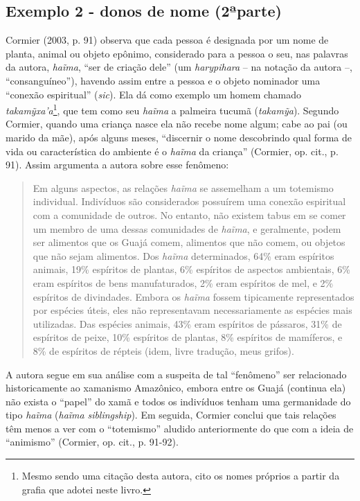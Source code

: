 \subsection{Exemplo 2 - donos de nome (2ªparte)}

Cormier (2003, p. 91) observa que cada pessoa é designada por um nome de
planta, animal ou objeto epônimo, considerado para a pessoa o seu, nas
palavras da autora, \emph{haĩma}, ``ser de criação dele'' (um
\emph{harypihara} -- na notação da autora --, ``consanguíneo''), havendo
assim entre a pessoa e o objeto nominador uma ``conexão espiritual''
(\emph{sic}). Ela dá como exemplo um homem chamado
\emph{takamỹxa'a}\footnote{Mesmo sendo uma citação desta autora, cito os
  nomes próprios a partir da grafia que adotei neste livro.}, que tem
como seu \emph{haĩma} a palmeira tucumã (\emph{takamỹa}). Segundo
Cormier, quando uma criança nasce ela não recebe nome algum; cabe ao pai
(ou marido da mãe), após alguns meses, ``discernir o nome descobrindo
qual forma de vida ou característica do ambiente é o \emph{haĩma} da
criança'' (Cormier, op. cit., p. 91). Assim argumenta a autora sobre esse
fenômeno:

\begin{quote}
Em alguns aspectos, as relações \emph{haĩma} se assemelham a um
totemismo individual. Indivíduos são considerados possuírem uma conexão
espiritual com a comunidade de outros. No entanto, não existem tabus em
se comer um membro de uma dessas comunidades de \emph{haĩma}, e
geralmente, podem ser alimentos que os Guajá comem, alimentos que não
comem, ou objetos que não sejam alimentos. Dos \emph{haĩma}
determinados, 64\% eram espíritos animais, 19\% espíritos de plantas,
6\% espíritos de aspectos ambientais, 6\% eram espíritos de bens
manufaturados, 2\% eram espíritos de mel, e 2\% espíritos de divindades.
Embora os \emph{haĩma} fossem tipicamente representados por espécies
úteis, eles não representavam necessariamente as espécies mais
utilizadas. Das espécies animais, 43\% eram espíritos de pássaros, 31\%
de espíritos de peixe, 10\% espíritos de plantas, 8\% espíritos de
mamíferos, e 8\% de espíritos de répteis (idem, livre tradução, meus
grifos).
\end{quote}

A autora segue em sua análise com a suspeita de tal ``fenômeno'' ser
relacionado historicamente ao xamanismo Amazônico, embora entre os Guajá
(continua ela) não exista o ``papel'' do xamã e todos os indivíduos tenham
uma germanidade do tipo \emph{haĩma} (\emph{haĩma} \emph{siblingship}).
Em seguida, Cormier conclui que tais relações têm menos a ver com o
``totemismo'' aludido anteriormente do que com a ideia de ``animismo''
(Cormier, op. cit., p. 91-92).

